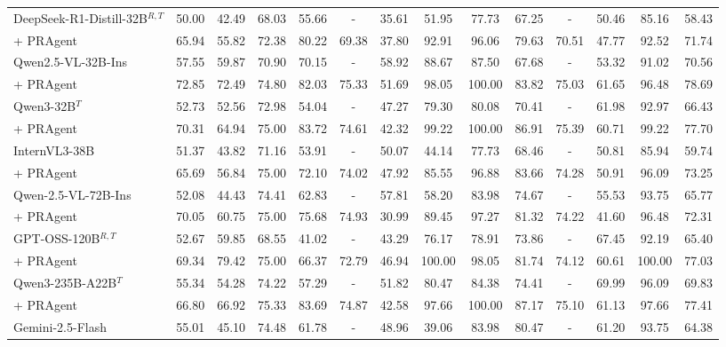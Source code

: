 \begin{table*}[t!]
{\begin{tabular}{l|cc|cccccc|cccc|c}
\midrule
DeepSeek-R1-Distill-32B$^{R,T}$ & 50.00 & 42.49 & 68.03 & 55.66 & - & 35.61 & 51.95 & 77.73 & 67.25 & - & 50.46 & 85.16 & 58.43 \\
\rowcolor[rgb]{0.928, 0.936, 0.997}
+ PRAgent & 65.94 & 55.82 & 72.38 & 80.22 & 69.38 & 37.80 & 92.91 & 96.06 & 79.63 & 70.51 & 47.77 & 92.52 & 71.74 \\
\midrule
Qwen2.5-VL-32B-Ins & 57.55 & 59.87 & 70.90 & 70.15 & - & 58.92 & 88.67 & 87.50 & 67.68 & - & 53.32 & 91.02 & 70.56 \\
\rowcolor[rgb]{0.928, 0.936, 0.997}
+ PRAgent & 72.85 & 72.49 & 74.80 & 82.03 & 75.33 & 51.69 & 98.05 & 100.00 & 83.82 & 75.03 & 61.65 & 96.48 & 78.69 \\
\midrule
Qwen3-32B$^{T}$ & 52.73 & 52.56 & 72.98 & 54.04 & - & 47.27 & 79.30 & 80.08 & 70.41 & - & 61.98 & 92.97 & 66.43 \\
\rowcolor[rgb]{0.928, 0.936, 0.997}
+ PRAgent & 70.31 & 64.94 & 75.00 & 83.72 & 74.61 & 42.32 & 99.22 & 100.00 & 86.91 & 75.39 & 60.71 & 99.22 & 77.70 \\
\midrule
InternVL3-38B & 51.37 & 43.82 & 71.16 & 53.91 & - & 50.07 & 44.14 & 77.73 & 68.46 & - & 50.81 & 85.94 & 59.74 \\
\rowcolor[rgb]{0.928, 0.936, 0.997}
+ PRAgent & 65.69 & 56.84 & 75.00 & 72.10 & 74.02 & 47.92 & 85.55 & 96.88 & 83.66 & 74.28 & 50.91 & 96.09 & 73.25 \\
\midrule
Qwen-2.5-VL-72B-Ins & 52.08 & 44.43 & 74.41 & 62.83 & - & 57.81 & 58.20 & 83.98 & 74.67 & - & 55.53 & 93.75 & 65.77 \\
\rowcolor[rgb]{0.928, 0.936, 0.997}
+ PRAgent & 70.05 & 60.75 & 75.00 & 75.68 & 74.93 & 30.99 & 89.45 & 97.27 & 81.32 & 74.22 & 41.60 & 96.48 & 72.31 \\
\midrule
GPT-OSS-120B$^{R,T}$ & 52.67 & 59.85 & 68.55 & 41.02 & - & 43.29 & 76.17 & 78.91 & 73.86 & - & 67.45 & 92.19 & 65.40 \\
\rowcolor[rgb]{0.928, 0.936, 0.997}
+ PRAgent & 69.34 & 79.42 & 75.00 & 66.37 & 72.79 & 46.94 & 100.00 & 98.05 & 81.74 & 74.12 & 60.61 & 100.00 & 77.03 \\
\midrule
Qwen3-235B-A22B$^{T}$ & 55.34 & 54.28 & 74.22 & 57.29 & - & 51.82 & 80.47 & 84.38 & 74.41 & - & 69.99 & 96.09 & 69.83 \\
\rowcolor[rgb]{0.928, 0.936, 0.997}
+ PRAgent & 66.80 & 66.92 & 75.33 & 83.69 & 74.87 & 42.58 & 97.66 & 100.00 & 87.17 & 75.10 & 61.13 & 97.66 & 77.41 \\
\midrule
Gemini-2.5-Flash & 55.01 & 45.10 & 74.48 & 61.78 & - & 48.96 & 39.06 & 83.98 & 80.47 & - & 61.20 & 93.75 & 64.38 \\

\end{tabular}}
\end{table*}
